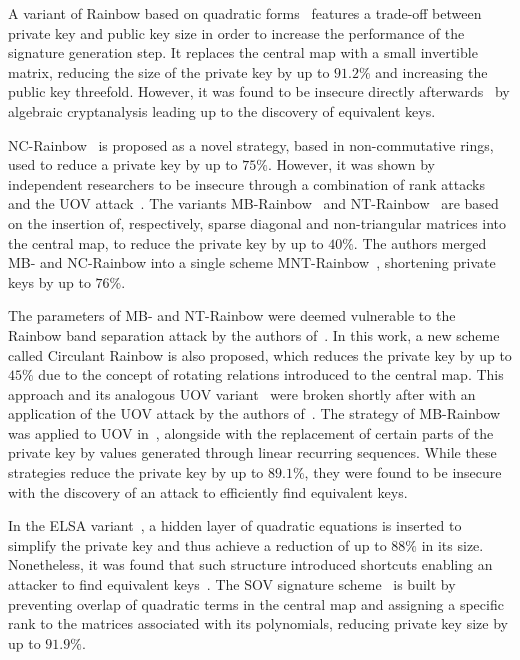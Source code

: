 \documentclass[draft, 12pt, a4paper, oneside]{memoir}
\theoremstyle{definition}
\begin{document}
A variant of Rainbow based on quadratic forms~\cite{Yasuda:201306} features a trade-off between private key and public key size in order to increase the performance of the signature generation step. It replaces the central map with a small invertible matrix, reducing the size of the private key by up to $91.2\%$ and increasing the public key threefold. However, it was found to be insecure directly afterwards~\cite{Hashimoto:201410} by algebraic cryptanalysis leading up to the discovery of equivalent keys.

NC-Rainbow~\cite{Yasuda:201202} is proposed as a novel strategy, based in non-commutative rings, used to reduce a private key by up to $75\%$. However, it was shown by independent researchers to be insecure through a combination of rank attacks and the UOV attack~\cite{Thomae:201209,Hashimoto:201302}. The variants MB-Rainbow~\cite{Yasuda:201305} and NT-Rainbow~\cite{Yasuda:201404} are based on the insertion of, respectively, sparse diagonal and non-triangular matrices into the central map, to reduce the private key by up to $40\%$. The authors merged MB- and NC-Rainbow into a single scheme MNT-Rainbow~\cite{Yasuda:201409}, shortening private keys by up to $76\%$. 

The parameters of MB- and NT-Rainbow were deemed vulnerable to the Rainbow band separation attack by the authors of~\cite{Peng:201706}. In this work, a new scheme called Circulant Rainbow is also proposed, which reduces the private key by up to $45\%$ due to the concept of rotating relations introduced to the central map. This approach and its analogous UOV variant~\cite{Peng:201803} were broken shortly after with an application of the UOV attack by the authors of~\cite{Hashimoto:201903}. The strategy of MB-Rainbow was applied to UOV in~\cite{Tan:201511}, alongside with the replacement of certain parts of the private key by values generated through linear recurring sequences. While these strategies reduce the private key by up to $89.1\%$, they were found to be insecure~\cite{Park:201803} with the discovery of an attack to efficiently find equivalent keys. 

In the ELSA variant~\cite{Shim:201712}, a hidden layer of quadratic equations is inserted to simplify the private key and thus achieve a reduction of up to $88\%$ in its size. Nonetheless, it was found that such structure introduced shortcuts enabling an attacker to find equivalent keys~\cite{Hashimoto:201909}. The SOV signature scheme~\cite{Shim:202001} is built by preventing overlap of quadratic terms in the central map and assigning a specific rank to the matrices associated with its polynomials, reducing private key size by up to $91.9\%$.
\end{document}

